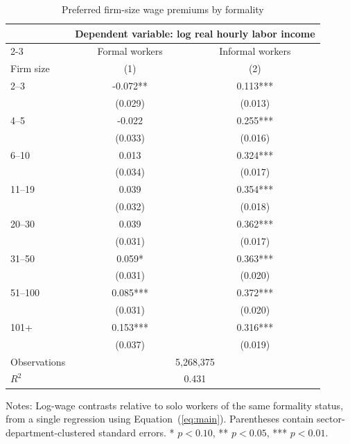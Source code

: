 \begin{table}[htbp]
  \centering
  \caption{Preferred firm-size wage premiums by formality}
  \label{tab:preferred-reference-summary}
  \small
  \begin{tabular}{lcc}
    \toprule
    & \multicolumn{2}{c}{Dependent variable: log real hourly labor income} \\
    \cmidrule(lr){2-3}
    & Formal workers & Informal workers \\
    Firm size & (1) & (2) \\
    \midrule
    2--3 & -0.072** & 0.113*** \\
     & (0.029) & (0.013) \\
    4--5 & -0.022 & 0.255*** \\
     & (0.033) & (0.016) \\
    6--10 & 0.013 & 0.324*** \\
     & (0.034) & (0.017) \\
    11--19 & 0.039 & 0.354*** \\
     & (0.032) & (0.018) \\
    20--30 & 0.039 & 0.362*** \\
     & (0.031) & (0.017) \\
    31--50 & 0.059* & 0.363*** \\
     & (0.031) & (0.020) \\
    51--100 & 0.085*** & 0.372*** \\
     & (0.031) & (0.020) \\
    101+ & 0.153*** & 0.316*** \\
     & (0.037) & (0.019) \\
    \midrule
    Observations & \multicolumn{2}{c}{5,268,375} \\
    $R^2$ & \multicolumn{2}{c}{0.431} \\
    \bottomrule
  \end{tabular}
  \vspace{0.3em}
  \begin{minipage}{0.95\textwidth}
    \footnotesize
    Notes: Log-wage contrasts relative to solo workers of the same formality status, from a single regression using Equation~(\ref{eq:main}). Parentheses contain sector-department-clustered standard errors. * $p<0.10$, ** $p<0.05$, *** $p<0.01$.
  \end{minipage}
\end{table}
